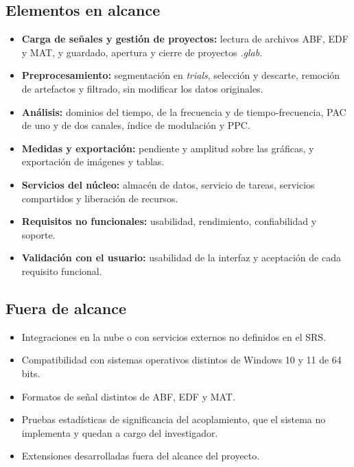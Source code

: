 \documentclass[12pt,letterpaper,oneside]{article}
\DeclareRobustCommand{\_}{\textunderscore\allowbreak}
\begin{document}
\subsection{Elementos en alcance}
\begin{itemize}
    \item \textbf{Carga de señales y gestión de proyectos:} lectura de archivos ABF, EDF y MAT, y guardado, apertura y cierre de proyectos \textit{.glab}.
    \item \textbf{Preprocesamiento:} segmentación en \textit{trials}, selección y descarte, remoción de artefactos y filtrado, sin modificar los datos originales.
    \item \textbf{Análisis:} dominios del tiempo, de la frecuencia y de tiempo-frecuencia, PAC de uno y de dos canales, índice de modulación y PPC.
    \item \textbf{Medidas y exportación:} pendiente y amplitud sobre las gráficas, y exportación de imágenes y tablas.
    \item \textbf{Servicios del núcleo:} almacén de datos, servicio de tareas, servicios compartidos y liberación de recursos.
    \item \textbf{Requisitos no funcionales:} usabilidad, rendimiento, confiabilidad y soporte.
    \item \textbf{Validación con el usuario:} usabilidad de la interfaz y aceptación de cada requisito funcional.
\end{itemize}

\subsection{Fuera de alcance}
\begin{itemize}
    \item Integraciones en la nube o con servicios externos no definidos en el SRS.
    \item Compatibilidad con sistemas operativos distintos de Windows 10 y 11 de 64 bits.
    \item Formatos de señal distintos de ABF, EDF y MAT.
    \item Pruebas estadísticas de significancia del acoplamiento, que el sistema no implementa y quedan a cargo del investigador.
    \item Extensiones desarrolladas fuera del alcance del proyecto.
\end{itemize}
\end{document}
